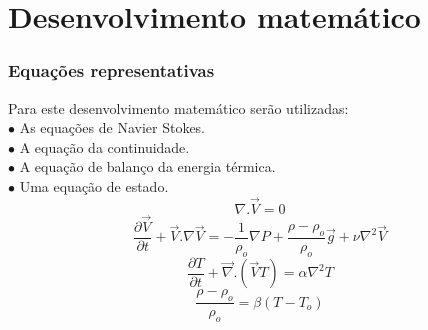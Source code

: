 \documentclass[xcolor=dvipsnames,10pt,aspectratio=169]{beamer}
\begin{document}
\section{Desenvolvimento matemático}

	\begin{frame}
		\frametitle{Equações representativas}
		\flushleft
		Para este desenvolvimento matemático serão utilizadas:\\
		\quad $\bullet$ As equações de Navier Stokes.\\
		\quad $\bullet$ A equação da continuidade.\\
		\quad $\bullet$ A equação de balanço da energia térmica.\\
		\quad $\bullet$ Uma equação de estado.\\
		
		\begin{equation}
		\nabla . \vec{V} = 0
		\end{equation}
		\begin{equation}
		\frac{\partial \vec{V}}{\partial t} +  \vec{V} . {\nabla} \vec{V}  =  -\frac{1}{\rho_o} {\nabla}P + \frac{\rho - \rho_o}{\rho_o} \vec{g} + \nu \nabla ^2 \vec{V}
		\end{equation}
		\begin{equation}
		\frac{\partial T}{\partial t} + \vec{\nabla} . \left( \vec{V}T \right) = \alpha \nabla^2T
		\end{equation}
		\begin{equation}
		\frac{\rho - \rho_o}{\rho_o} = \beta \left( T - T_o\right)
		\end{equation}
	
	\end{frame}
\end{document}

